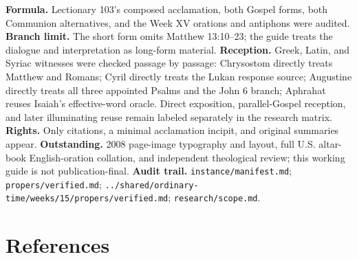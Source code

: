 \begin{deepstudy}
\begin{studyframe}
\textbf{Formula.} Lectionary 103's composed acclamation, both Gospel forms, both Communion alternatives, and the Week XV orations and antiphons were audited. \textbf{Branch limit.} The short form omits Matthew 13:10--23; the guide treats the dialogue and interpretation as long-form material. \textbf{Reception.} Greek, Latin, and Syriac witnesses were checked passage by passage: Chrysostom directly treats Matthew and Romans; Cyril directly treats the Lukan response source; Augustine directly treats all three appointed Psalms and the John 6 branch; Aphrahat reuses Isaiah's effective-word oracle. Direct exposition, parallel-Gospel reception, and later illuminating reuse remain labeled separately in the research matrix. \textbf{Rights.} Only citations, a minimal acclamation incipit, and original summaries appear. \textbf{Outstanding.} 2008 page-image typography and layout, full U.S. altar-book English-oration collation, and independent theological review; this working guide is not publication-final. \textbf{Audit trail.} \nolinkurl{instance/manifest.md}; \nolinkurl{propers/verified.md}; \nolinkurl{../shared/ordinary-time/weeks/15/propers/verified.md}; \nolinkurl{research/scope.md}.
\end{studyframe}

\section*{References}


\end{deepstudy}
